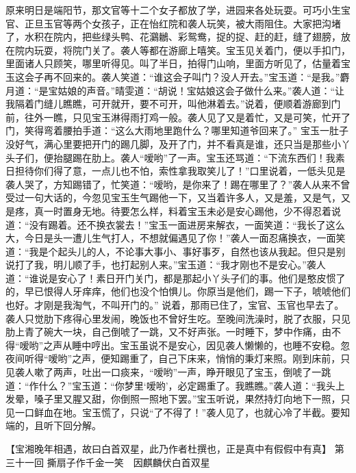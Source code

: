 \documentclass[12pt,oneside]{book}
\begin{document}
原来明日是端阳节，那文官等十二个女子都放了学，进园来各处玩耍。可巧小生宝官、正旦玉官等两个女孩子，正在怡红院和袭人玩笑，被大雨阻住。大家把沟堵了，水积在院内，把些绿头鸭、花鸂鶒、彩鸳鸯，捉的捉、赶的赶，缝了翅膀，放在院内玩耍，将院门关了。袭人等都在游廊上嘻笑。宝玉见关着门，便以手扣门，里面诸人只顾笑，哪里听得见。叫了半日，拍得门山响，里面方听见了，估量着宝玉这会子再不回来的。袭人笑道：“谁这会子叫门？没人开去。”宝玉道：“是我。”麝月道：“是宝姑娘的声音。”晴雯道：“胡说！宝姑娘这会子做什么来。”袭人道：“让我隔着门缝儿瞧瞧，可开就开，要不可开，叫他淋着去。”说着，便顺着游廊到门前，往外一瞧，只见宝玉淋得雨打鸡一般。袭人见了又是着忙，又是可笑，忙开了门，笑得弯着腰拍手道：“这么大雨地里跑什么？哪里知道爷回来了。”
宝玉一肚子没好气，满心里要把开门的踢几脚，及开了门，并不看真是谁，还只当是那些小丫头子们，便抬腿踢在肋上。袭人“嗳哟”了一声。宝玉还骂道：“下流东西们！我素日担待你们得了意，一点儿也不怕，索性拿我取笑儿了！”口里说着，一低头见是袭人哭了，方知踢错了，忙笑道：“嗳哟，是你来了！踢在哪里了？”袭人从来不曾受过一句大话的，今忽见宝玉生气踢他一下，又当着许多人，又是羞，又是气，又是疼，真一时置身无地。待要怎么样，料着宝玉未必是安心踢他，少不得忍着说道：“没有踢着。还不换衣裳去！”宝玉一面进房来解衣，一面笑道：“我长了这么大，今日是头一遭儿生气打人，不想就偏遇见了你！”袭人一面忍痛换衣，一面笑道：“我是个起头儿的人，不论事大事小、事好事歹，自然也该从我起。但只是别说打了我，明儿顺了手，也打起别人来。”宝玉道：“我才刚也不是安心。”袭人道：“谁说是安心了！素日开门关门，都是那起小丫头子们的事。他们是憨皮惯了的，早已恨得人牙痒痒，他们也没个怕惧儿。你原当是他们，踢一下子，唬唬他们也好。才刚是我淘气，不叫开门的。”
说着，那雨已住了，宝官、玉官也早去了。袭人只觉肋下疼得心里发闹，晚饭也不曾好生吃。至晚间洗澡时，脱了衣服，只见肋上青了碗大一块，自己倒唬了一跳，又不好声张。一时睡下，梦中作痛，由不得“嗳哟”之声从睡中哼出。宝玉虽说不是安心，因见袭人懒懒的，也睡不安稳。忽夜间听得“嗳哟”之声，便知踢重了，自己下床来，悄悄的秉灯来照。刚到床前，只见袭人嗽了两声，吐出一口痰来，“嗳哟”一声，睁开眼见了宝玉，倒唬了一跳道：“作什么？”宝玉道：“你梦里‘嗳哟’，必定踢重了。我瞧瞧。”袭人道：“我头上发晕，嗓子里又腥又甜，你倒照一照地下罢。”宝玉听说，果然持灯向地下一照，只见一口鲜血在地。宝玉慌了，只说“了不得了！”袭人见了，也就心冷了半截。要知端的，且听下回分解。


 
【宝湘晚年相遇，故曰白首双星，此乃作者杜撰也，正是真中有假假中有真】
第三十一回  撕扇子作千金一笑　因麒麟伏白首双星
\end{document}
